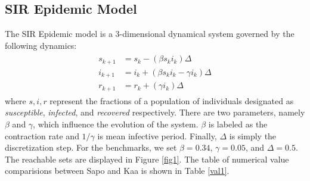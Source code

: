 \documentclass[EPiC]{easychair}
\begin{document}
\subsection{SIR Epidemic Model}
\noindent The SIR Epidemic model is a 3-dimensional dynamical system governed by the following dynamics:
\begin{align} \label{eqn:sir}
    \begin{split}
        s_{k+1} &= s_k - (\beta s_k i_k)\Delta \\
        i_{k+1} &= i_k + (\beta s_k i_k - \gamma i_k)\Delta \\
        r_{k+1} &= r_k + (\gamma i_k)\Delta
    \end{split}
\end{align} 
where $s,i,r$ represent the fractions of a population of individuals designated as \textit{susceptible}, \textit{infected}, and \textit{recovered} respectively. There are two parameters, namely $\beta$ and $\gamma$, which influence the evolution of the system. $\beta$ is labeled as the contraction rate and $1/\gamma$ is mean infective period. Finally, $\Delta$ is simply the discretization step. For the benchmarks, we set $\beta = 0.34$, $\gamma=0.05$, and $\Delta=0.5$. The reachable sets are displayed in Figure \ref{fig1}. The table of numerical value comparisions between Sapo and Kaa is shown in Table \ref{val1}.
\end{document}
